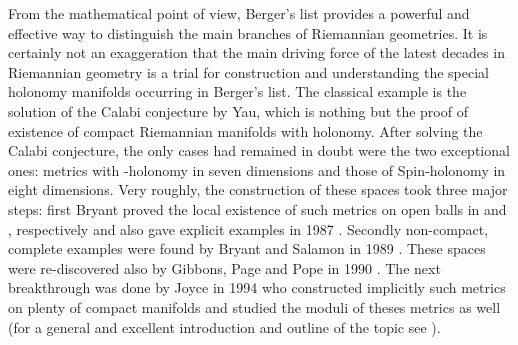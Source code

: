 \documentclass[a4paper,12pt,draft]{article}
\begin{document}
From the mathematical point of view,
Berger's list provides a powerful and effective way to distinguish 
the main branches of Riemannian geometries. It is certainly not
an exaggeration that the main driving force of the latest decades in
Riemannian geometry is a trial for construction and understanding the
special holonomy manifolds occurring in Berger's list. The classical
example is the solution of the Calabi conjecture by Yau, which is nothing
but the proof of existence of compact Riemannian manifolds with \coordHE{}
holonomy. After solving the Calabi conjecture, the only cases had remained
in doubt were the two exceptional ones: metrics with \coordHE{}-holonomy in
seven dimensions and those of Spin\coordHE{}-holonomy in eight
dimensions. Very roughly, the
construction of these spaces took three major steps: first Bryant proved
the local existence of such metrics on open balls in \coordHE{} and \coordHE{},
respectively and also gave explicit examples in 1987 \cite{bry}. Secondly
non-compact, complete examples were found by Bryant and Salamon in
1989 \cite{bry-sal}. These spaces were re-discovered also by Gibbons,
Page and Pope in 1990 \cite{gib-pag-pop}. The next breakthrough was done
by Joyce in 1994 who constructed implicitly such metrics on plenty 
of compact manifolds and studied the moduli of theses metrics as well (for
a general and excellent introduction and outline of the topic see
\cite{joy}). 
\end{document}
